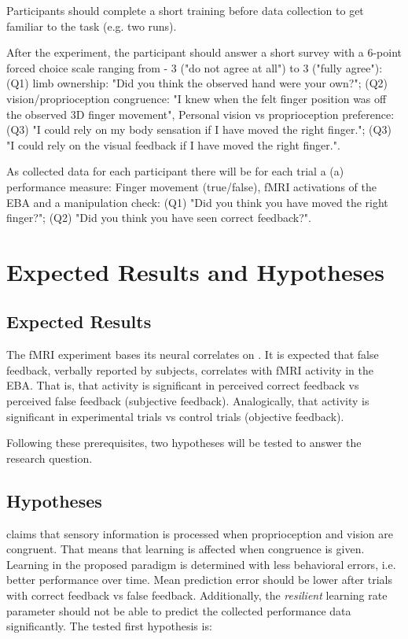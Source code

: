 \documentclass[man]{apa7}
\begin{document}
Participants should complete a short training before data collection to get familiar to the task (e.g. two runs).

After the experiment, the participant should answer a short survey with a 6-point forced choice scale ranging from - 3 ("do not agree at all") to 3 ("fully agree"): (Q1) limb ownership: "Did you think the observed hand were your own?"; (Q2) vision/proprioception congruence: "I knew when the felt finger position was off the observed 3D finger movement", Personal vision vs proprioception preference: (Q3) "I could rely on my body sensation if I have moved the right finger."; (Q3) "I could rely on the visual feedback if I have moved the right finger.".

As collected data for each participant there will be for each trial a (a) performance measure: Finger movement (true/false), fMRI activations of the EBA and a manipulation check: (Q1) "Did you think you have moved the right finger?"; (Q2) "Did you think you have seen correct feedback?".

\section{Expected Results and Hypotheses}

\subsection{Expected Results}

The fMRI experiment bases its neural correlates on \parencite{Limanowski2016}. It is expected that false feedback, verbally reported by subjects, correlates with fMRI activity in the EBA. That is, that activity is significant in perceived correct feedback vs perceived false feedback (subjective feedback). Analogically, that activity is significant in experimental trials vs control trials (objective feedback).

Following these prerequisites, two hypotheses will be tested to answer the research question.

\subsection{Hypotheses}
\citeauthor{Limanowski2016} claims that sensory information is processed when proprioception and vision are congruent. That means that learning is affected when congruence is given. Learning in the proposed paradigm is determined with less behavioral errors, i.e. better performance over time. Mean prediction error should be lower after trials with correct feedback vs false feedback. Additionally, the \textit{resilient} learning rate parameter should not be able to predict the collected performance data significantly. The tested first hypothesis is:\\
\end{document}
